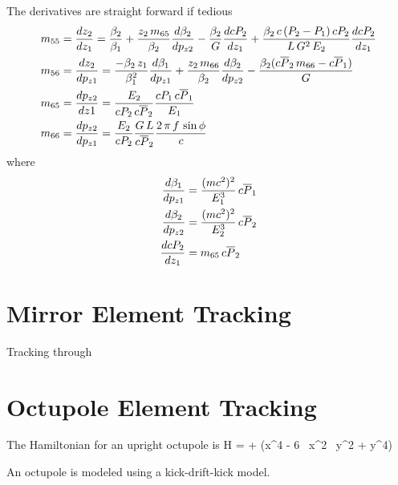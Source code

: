 The derivatives are straight forward if tedious
\begin{align}
  m_{55} &= \frac{dz_2}{dz_1} = 
    \frac{\beta_2}{\beta_1} + 
    \frac{z_2 \, m_{65}}{\beta_2} \frac{d\beta_2}{dp_{z2}} - 
    \frac{\beta_2}{G} \frac{dcP_2}{dz_1} +
    \frac{\beta_2 \, c \, (P_2 - P_1) \, c P_2}{L \, G^2 \, E_2} 
      \frac{dcP_2}{dz_1} \nonumber \\
  m_{56} &= \frac{dz_2}{dp_{z1}} = 
    \frac{-\beta_2 \, z_1}{\beta_1^2} \frac{d\beta_1}{dp_{z1}} + 
    \frac{z_2 \, m_{66}}{\beta_2} \frac{d\beta_2}{dp_{z2}} -
    \frac{\beta_2 ( c \overline{P}_{2} \, m_{66} - c \overline{P}_{1})}{G} \nonumber \\
  m_{65} &= \frac{dp_{z2}}{dz1} =
    \frac{E_2}{cP_2 \, c\overline{P}_{2}} \frac{cP_1 \, c\overline{P}_{1}}{E_1}  \\
  m_{66} &= \frac{dp_{z2}}{dp_{z1}} = 
    \frac{E_2}{cP_2} \frac{G \, L}{c \overline{P}_{2}} \frac{2 \, \pi \, f \, \sin\phi}{c}
    \nonumber
\end{align}
where
\begin{align}
  \frac{d\beta_1}{dp_{z1}}  &= \frac{(mc^2)^2}{E_1^3} \, c\overline{P}_{1} \nonumber \\
  \frac{d\beta_2}{dp_{z2}}  &= \frac{(mc^2)^2}{E_2^3} \, c\overline{P}_{2} \\
  \frac{dcP_2}{dz_1}        &= m_{65} \, c\overline{P}_{2}  \nonumber
\end{align}

\section{Mirror Element Tracking}
\label{s:mirror.std}

Tracking through

\section{Octupole Element Tracking}
\label{s:octupole.std}

The Hamiltonian for an upright octupole is
\Begineq
  H =  +  (x^4 - 6 \, x^2 \, y^2 + y^4)
\Endeq

An octupole is modeled using a kick-drift-kick model.

